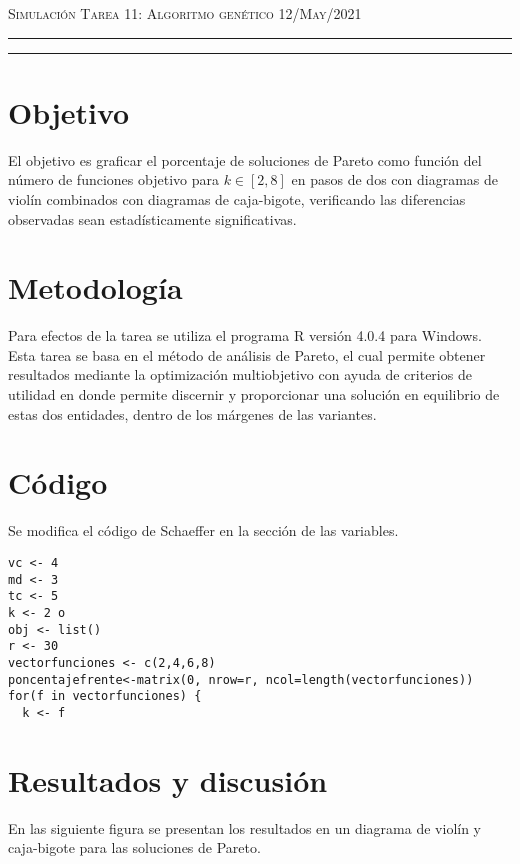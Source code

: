 \documentclass[12pt]{amsart}
\begin{document}
\pagestyle{empty}



\thispagestyle{empty}

{\scshape Simulación} \hfill {\scshape \Large Tarea 11: Algoritmo genético} \hfill  {\scshape 12/May/2021}
\author{C. María Montemayor Palos}
\maketitle
\hrule
\hrule
\bigskip
\section{Objetivo}
El objetivo es graficar el porcentaje de soluciones de Pareto como función del número de funciones objetivo para $k \in [2, 8]$ en pasos de dos con diagramas de violín combinados con diagramas de caja-bigote, verificando las diferencias observadas sean estadísticamente significativas.

\section{Metodología}
Para efectos de la tarea \cite{dra} se utiliza el programa R versión 4.0.4 \cite{R} para Windows. Esta tarea se basa en el método de análisis de Pareto, el cual permite obtener resultados mediante la optimización multiobjetivo con ayuda de criterios de utilidad en donde permite discernir y proporcionar una solución en equilibrio de estas dos entidades, dentro de los márgenes de las variantes.


\section{Código}
Se modifica el código de Schaeffer \cite{codigo} en la sección de las variables.
\renewcommand{\listingscaption}{Código}
\begin{listing}[H]
  \begin{verbatim}
vc <- 4 
md <- 3 
tc <- 5 
k <- 2 o
obj <- list()
r <- 30 
vectorfunciones <- c(2,4,6,8)
poncentajefrente<-matrix(0, nrow=r, ncol=length(vectorfunciones))
for(f in vectorfunciones) {
  k <- f 
  \end{verbatim}
  \label{codigo1}
\end{listing}


\clearpage
\section{Resultados y discusión}
En las siguiente figura se presentan los resultados en un diagrama de violín y caja-bigote para las soluciones de Pareto.
\end{document}
